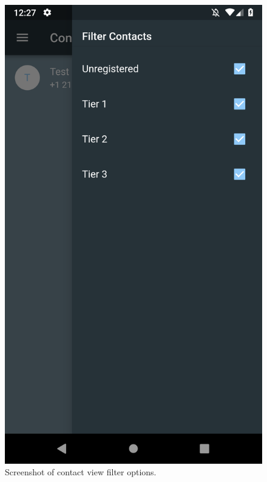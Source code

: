 \documentclass[10pt, a4paper]{article}
\begin{document}
\begin{figure}[H]
  \includegraphics[width=\linewidth]{final-diagrams/Emulator-Screenshots/Screenshot_1556126828.png}
  \caption{Screenshot of contact view filter options.}
\endminipage
\end{figure}
\end{document}
